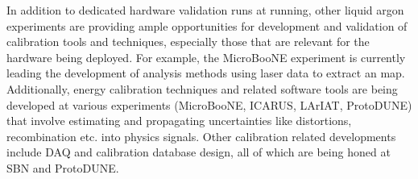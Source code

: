 In addition to dedicated hardware validation runs at  running, other liquid argon experiments are providing ample opportunities for development and validation of calibration tools and techniques, especially those that are relevant for the hardware being deployed. For example, the MicroBooNE experiment is currently leading the development of analysis methods using laser data to extract an \efield map. Additionally, energy calibration techniques and related software tools are being developed at various experiments (MicroBooNE, ICARUS, LArIAT, ProtoDUNE) that involve estimating and propagating uncertainties like \efield distortions, recombination etc. into physics signals. Other calibration related developments include DAQ and calibration database design, all of which are being honed at SBN and ProtoDUNE.
 

